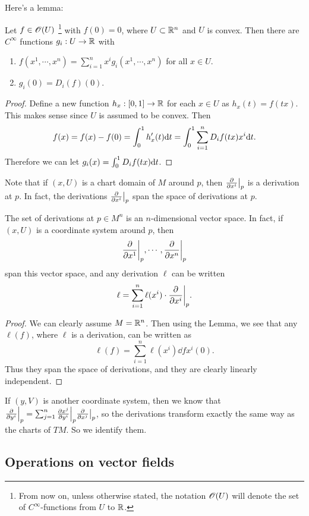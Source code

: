 \documentclass[11pt, english]{article}
\begin{document}
Here's a lemma:
\begin{lemma}
Let $f \in \operatorname{\mathscr{O}}(U)$ \footnote{From now on, unless otherwise stated, the notation $\operatorname{\mathscr{O}}(U)$ will denote the set of $C^\infty$-functions from $U$ to $\mathbb{R}$.} with $f(0)=0$, where $U \subset \mathbb{R}^n$ and $U$ is convex. Then there are $C^\infty$ functions $g_i: U \to \mathbb{R}$ with
\begin{enumerate}
\item $f(x^1,\cdots,x^n) = \sum_{i=1} ^n x^i g_i(x^1,\cdots, x^n)$ for all $x \in U$.
\item $g_i(0) = D_i(f)(0)$.
\end{enumerate}
\end{lemma}
\begin{proof}
 Define a new function $h_x:[0,1] \to \mathbb{R}$ for each $x \in U$ as $h_x(t)=f(tx)$. This makes sense since $U$ is assumed to be convex. Then
\[
f(x)=f(x)-f(0) = \int_0^1 h_x^\prime (t) \mathrm{d}{t} = \int_0 ^ 1 \sum_{i=1} ^n D_if(tx) x^i \mathrm{d}{t}.
\]
Therefore we can let $g_i(x)=\int_0^1 D_i f(tx) \mathrm{d}{t}$. 
\end{proof}

Note that if $(x,U)$ is a chart domain of $M$ around $p$, then $\restr{\dd{}{x^i}}{p}$ is a derivation at $p$. In fact, the derivations $\restr{\dd{}{x^i}}{p}$ span the space of derivations at $p$. 

\begin{thm}
The set of derivations at $p \in M^n$ is an $n$-dimensional vector space. In fact, if $(x,U)$ is a coordinate system around $p$, then
\[
\restr{\dd{}{x^1}}{p}, \cdots, \restr{\dd{}{x^n}}{p}
\]
span this vector space, and any derivation $\ell$ can be written 
\[
\ell = \sum_{i=1}^n \ell(x^i) \cdot \restr{\dd{}{x^i}}{p}.
\]
\end{thm}
\begin{proof}
We can clearly assume $M=\mathbb{R}^n$. Then using the Lemma, we see that any $\ell(f)$, where $\ell$ is a derivation, can be written as
\[
\ell(f) = \sum_{i=1} ^n \ell(x^i) \dd{f}{x^i}(0).
\]
Thus they span the space of derivations, and they are clearly linearly independent. 
\end{proof}

If $(y,V)$ is another coordinate system, then we know that $\restr{\dd{}{y^i}}{p} = \sum_{j=1}^n \restr{\dd{x^j}{y^i}}{p} \restr{\dd{}{x^j}}{p}$, so the derivations transform exactly the same way as the charts of $TM$. So we identify them.


\subsection{Operations on vector fields}
\end{document}
